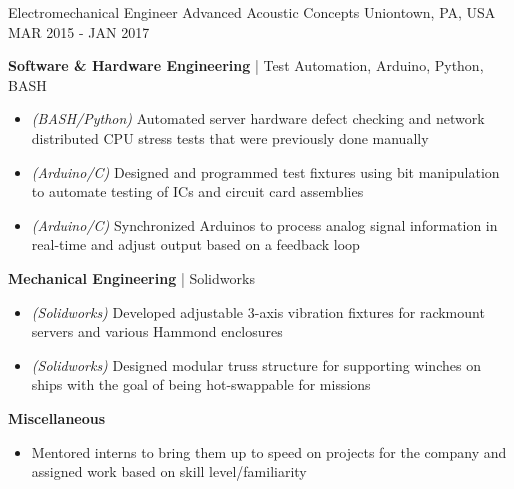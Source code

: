 \begin{cventries}
	\cventry
	{Electromechanical Engineer} %
	{Advanced Acoustic Concepts} %
	{Uniontown, PA, USA} %
	{MAR 2015 - JAN 2017} %
	{
		\begin{cvitems} %
			\item {\textbf{Software \& Hardware Engineering} | {\color{awesome}Test Automation, Arduino, Python, BASH}
				\begin{itemize}[noitemsep,wide=0pt, leftmargin=\dimexpr{} + 2\relax]
					\item[\textbullet]{\textit{(BASH/Python)} Automated server hardware defect checking and network distributed CPU stress tests that were previously done manually}
					\item[\textbullet]{\textit{(Arduino/C)} Designed and programmed test fixtures using bit manipulation to automate testing of ICs and circuit card assemblies}
					\item[\textbullet]{\textit{(Arduino/C)} Synchronized Arduinos to process analog signal information in real-time and adjust output based on a feedback loop}
				\end{itemize}}
			\item {\textbf{Mechanical Engineering} | {\color{awesome}Solidworks}
				\begin{itemize}[noitemsep,wide=0pt, leftmargin=\dimexpr{} + 2\relax]
					\item[\textbullet]{\textit{(Solidworks)} Developed adjustable 3-axis vibration fixtures for rackmount servers and various Hammond enclosures}
					\item[\textbullet]{\textit{(Solidworks)} Designed modular truss structure for supporting winches on ships with the goal of being hot-swappable for missions}
				\end{itemize}}
			\item {\textbf{Miscellaneous}
				\begin{itemize}[noitemsep,wide=0pt, leftmargin=\dimexpr{} + 2\relax]
					\item[\textbullet]{Mentored interns to bring them up to speed on projects for the company and assigned work based on skill level/familiarity}
				\end{itemize}}
		\end{cvitems}
	}
	
\end{cventries}
